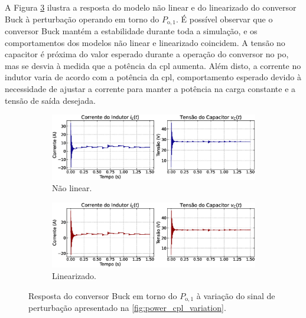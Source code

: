 A Figura \ref{fig:simulation2_op1} ilustra a resposta do modelo não linear e do linearizado do conversor Buck à perturbação operando em torno do $P_{\mathrm{o}, 1}$.  É possível observar que o conversor Buck mantém a estabilidade durante toda a simulação, e os comportamentos dos modelos não linear e linearizado coincidem. A tensão no capacitor é próxima do valor esperado durante a operação do conversor no \acrshort{po}, mas se desvia à medida que a potência da \acrshort{cpl} aumenta. Além disto, a corrente no indutor varia de acordo com a potência da \acrshort{cpl}, comportamento esperado devido à necessidade de ajustar a corrente para manter a potência na carga constante e a tensão de saída desejada.

\begin{figure}[H]
  \centering
  \captionsetup{justification=centering}
  \begin{subfigure}{1.\textwidth}
    \centering
    \includegraphics[width=1.\textwidth]{figuras/buck/sim2/op1/result_nonlinear.eps}
    \caption{Não linear.}
    \label{fig:simulation2_op1_nonlinear}
  \end{subfigure}
  \newline
  \begin{subfigure}{1.\textwidth}
    \centering
    \includegraphics[width=1.\textwidth]{figuras/buck/sim2/op1/result_linear.eps}
    \caption{Linearizado.}
    \label{fig:simulation2_op1_linear}
  \end{subfigure}
  \caption{Resposta do conversor Buck em torno do $P_{\mathrm{o}, 1}$ à variação do sinal de perturbação apresentado na \autoref{fig:power_cpl_variation}.}
  \label{fig:simulation2_op1}
\end{figure}

